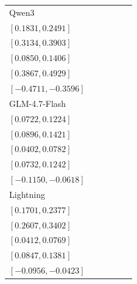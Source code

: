 \begin{tabular*}{\linewidth}{@{\extracolsep{\fill}}lccccc@{}}
Qwen3 & \begin{tabular}[t]{@{}c@{}}\(0.2155\)\\\([0.1831,0.2491]\)\end{tabular} & \begin{tabular}[t]{@{}c@{}}\(0.3517\)\\\([0.3134,0.3903]\)\end{tabular} & \begin{tabular}[t]{@{}c@{}}\(0.1121\)\\\([0.0850,0.1406]\)\end{tabular} & \begin{tabular}[t]{@{}c@{}}\(0.4397\)\\\([0.3867,0.4929]\)\end{tabular} & \begin{tabular}[t]{@{}c@{}}\(-0.4155\)\\\([-0.4711,-0.3596]\)\end{tabular}\\[2pt]
GLM-4.7-Flash & \begin{tabular}[t]{@{}c@{}}\(0.0966\)\\\([0.0722,0.1224]\)\end{tabular} & \begin{tabular}[t]{@{}c@{}}\(0.1155\)\\\([0.0896,0.1421]\)\end{tabular} & \begin{tabular}[t]{@{}c@{}}\(0.0586\)\\\([0.0402,0.0782]\)\end{tabular} & \begin{tabular}[t]{@{}c@{}}\(0.0983\)\\\([0.0732,0.1242]\)\end{tabular} & \begin{tabular}[t]{@{}c@{}}\(-0.0879\)\\\([-0.1150,-0.0618]\)\end{tabular}\\[2pt]
Lightning & \begin{tabular}[t]{@{}c@{}}\(0.2034\)\\\([0.1701,0.2377]\)\end{tabular} & \begin{tabular}[t]{@{}c@{}}\(0.3000\)\\\([0.2607,0.3402]\)\end{tabular} & \begin{tabular}[t]{@{}c@{}}\(0.0586\)\\\([0.0412,0.0769]\)\end{tabular} & \begin{tabular}[t]{@{}c@{}}\(0.1103\)\\\([0.0847,0.1381]\)\end{tabular} & \begin{tabular}[t]{@{}c@{}}\(-0.0690\)\\\([-0.0956,-0.0423]\)\end{tabular}\\[2pt]

\end{tabular*}
